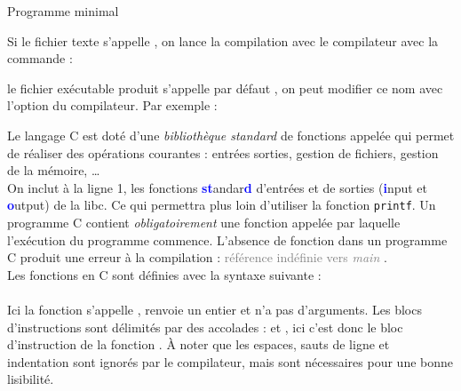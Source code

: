\documentclass[10pt]{beamer}
\begin{document}
\begin{frame}[fragile]{\Ctitle}{\stitle}
	\begin{exampleblock}{Programme minimal}
		\begin{overprint}
			\medskip
			Si le fichier texte s'appelle , on lance la compilation avec le compilateur  avec la commande :
			\begin{mdframed}[backgroundcolor=codebg] \end{mdframed}
			le fichier exécutable produit s'appelle par défaut , on peut modifier ce nom avec l'option  du compilateur. Par exemple :
			\begin{mdframed}[backgroundcolor=codebg]   \end{mdframed}
			\medskip
			Le langage C est doté d'une \textit{bibliothèque standard} de fonctions appelée  qui permet de réaliser des opérations courantes : entrées sorties, gestion de fichiers, gestion de la mémoire, \dots \\
			On inclut à la ligne 1, les fonctions \textcolor{blue}{\textbf{st}}andar\textcolor{blue}{\textbf{d}} d'entrées et de sorties (\textcolor{blue}{\textbf i}nput et \textcolor{blue}{\textbf o}utput)  de la libc. Ce qui permettra plus loin d'utiliser la fonction \texttt{printf}.
			\onslide<3>
			\medskip
			Un programme C contient \textit{obligatoirement} une fonction appelée  par laquelle l'exécution du programme commence. L'absence de fonction  dans un programme C produit une erreur à la compilation : \og{} \textcolor{gray}{référence indéfinie vers \textit{main}} \fg{}. \\
			Les fonctions en C sont définies avec la syntaxe suivante :\\   \\
			Ici la fonction s'appelle , renvoie un entier  et n'a pas d'arguments.
			\onslide<4>
			\medskip
			Les blocs d'instructions sont délimités par des accolades : \kw{\{} et \kw{\}}, ici c'est donc le bloc d'instruction de la fonction . À noter que les espaces, sauts de ligne et indentation sont ignorés par le compilateur, mais sont nécessaires pour une bonne lisibilité.

\end{overprint}
\end{exampleblock}
\end{frame}
\end{document}
